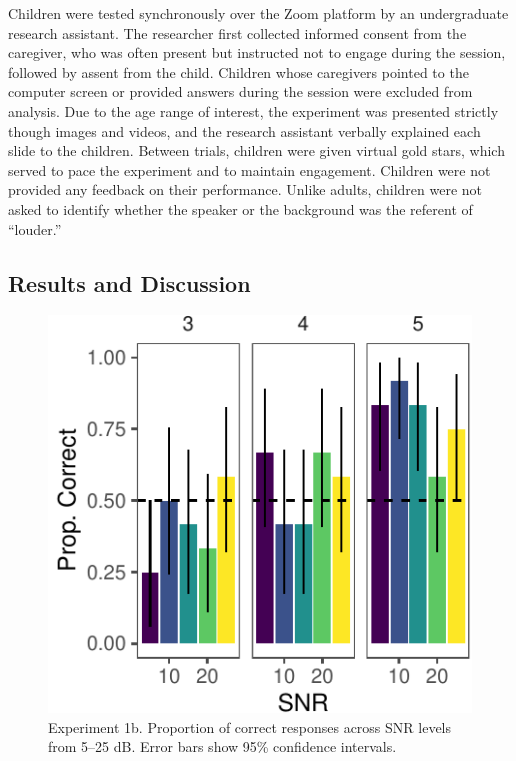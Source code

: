 \documentclass[10pt, letterpaper]{article}
\newenvironment{CodeChunk}{}{}
\begin{document}
Children were tested synchronously over the Zoom platform by an
undergraduate research assistant. The researcher first collected
informed consent from the caregiver, who was often present but
instructed not to engage during the session, followed by assent from the
child. Children whose caregivers pointed to the computer screen or
provided answers during the session were excluded from analysis. Due to
the age range of interest, the experiment was presented strictly though
images and videos, and the research assistant verbally explained each
slide to the children. Between trials, children were given virtual gold
stars, which served to pace the experiment and to maintain engagement.
Children were not provided any feedback on their performance. Unlike
adults, children were not asked to identify whether the speaker or the
background was the referent of ``louder.''

\hypertarget{results-and-discussion-1}{%
\subsection{Results and Discussion}\label{results-and-discussion-1}}

\begin{CodeChunk}
\begin{figure}[t]

{\centering \includegraphics{figs/e1b-bar-1} 

}

\caption[Experiment 1b]{Experiment 1b. Proportion of correct responses across SNR levels from 5--25 dB. Error bars show 95\% confidence intervals.}\label{fig:e1b-bar}
\end{figure}
\end{CodeChunk}
\end{document}
